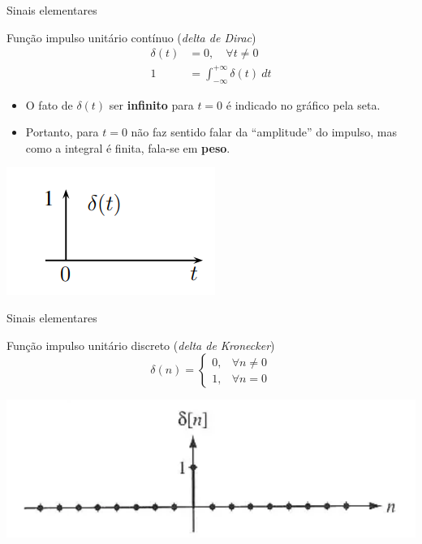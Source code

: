 \begin{frame}{Sinais elementares}
\begin{block}{Função impulso unitário contínuo (\textit{delta de Dirac})}
\vspace{0.2cm}
\begin{align*}
    \delta (t) & = 0, \quad \forall t \neq 0 \\
    1 & = \int_{-\infty}^{+\infty} \delta (t) \ dt
\end{align*}
\begin{itemize}
    \item O fato de $\delta(t)$ ser \textbf{infinito} para $t = 0$ é indicado no gráfico pela seta. 
    \item Portanto, para $t = 0$ não faz sentido falar da “amplitude” do impulso, mas como a integral é finita, fala-se em \textbf{peso}.
\end{itemize}
\end{block}
\centerline{\includegraphics[width=0.4\linewidth]{Figuras/Ch01/fig9.PNG}}
\end{frame}

\begin{frame}{Sinais elementares}
\begin{block}{Função impulso unitário discreto (\textit{delta de Kronecker})}
\begin{equation*}
\delta(n) = \begin{cases}
0, & \forall n \neq 0 \\
1, & \forall n = 0
\end{cases}
\end{equation*}
\end{block}
\vspace{0.2cm}
\centerline{\includegraphics[width=0.8\linewidth]{Figuras/Ch01/fig10.PNG}}
\end{frame}


